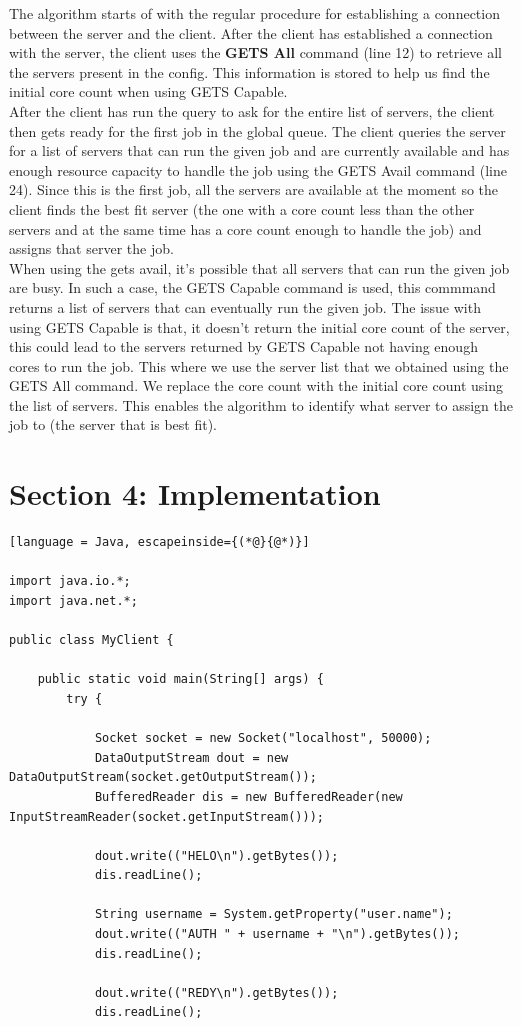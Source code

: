 \documentclass[a4paper]{article} %
\begin{document}
The algorithm starts of with the regular procedure for establishing a connection between the server and the client. 
After the client has established a connection with the server, the client uses the \textbf{GETS All} command (line 12) to retrieve 
all the servers present in the config. This information is stored to help us find the initial core count when using GETS Capable.\\ 

After the client has run the query to ask for the entire list of servers, the client then gets ready for the first job in the global 
queue. The client queries the server for a list of servers that can run the given job and are currently available and has enough 
resource capacity to handle the job using the GETS Avail command (line 24). Since this is the first job, all the servers are available at the moment
so the client finds the best fit server (the one with a core count less than the other servers and at the same time has a core count 
enough to handle the job) and assigns that server the job. \\

When using the gets avail, it's possible that all servers that can run the given job are busy. In such a case, the GETS Capable command 
is used, this commmand returns a list of servers that can eventually run the given job. The issue with using GETS Capable is that, 
it doesn't return the initial core count of the server, this could lead to the servers returned by GETS Capable not having enough 
cores to run the job. This where we use the server list that we obtained using the GETS All command. We replace the core count 
with the initial core count using the list of servers. This enables the algorithm to identify what server to assign the job to (the server
that is best fit).\\

\section*{Section 4: Implementation}\label{sec:section4}

\begin{lstlisting}[language = Java, escapeinside={(*@}{@*)}]

import java.io.*;
import java.net.*;

public class MyClient {

	public static void main(String[] args) {
		try {

			Socket socket = new Socket("localhost", 50000);
			DataOutputStream dout = new DataOutputStream(socket.getOutputStream());
			BufferedReader dis = new BufferedReader(new InputStreamReader(socket.getInputStream()));

			dout.write(("HELO\n").getBytes());
			dis.readLine();

			String username = System.getProperty("user.name");
			dout.write(("AUTH " + username + "\n").getBytes());
			dis.readLine();

			dout.write(("REDY\n").getBytes());
			dis.readLine();
\end{lstlisting}
\end{document}
